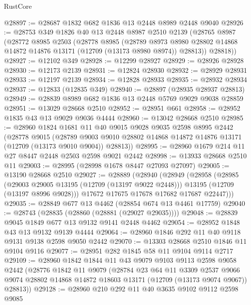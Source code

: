 \begin{lexlean}{RustCore}
\begin{coremodule}
@28897 := @28687 @1832 @682 @1836 @13 @2448 @8989 @2448 @9040
@28926 := @28753
    @349
    @1826
    @40
    @13
    @2448
    @8987
    @2510
    @2139
    (@28765
      @8987
      (@28772
        @8985
        @2503
        (@28778
          @8985
          (@28789
            @8973
            @8980
            @28802
            @14868
            @14872
            @14876
            @13171
            (@12709 (@13173 @8980 @8974))
            @28813))
        @28818))
@28927 := @12102 @349
@28928 := @12299 @28927
@28929 := @28926 @28928
@28930 := @12173 @2139
@28931 := @12824 @28930
@28932 := @28929 @28931
@28933 := @12197 @2139
@28934 := @12828 @28933
@28935 := @28932 @28934
@28937 := @12833 (@12835 @349)
@28940 := @28897 (@28935 @28937 @28813)
@28949 := @28839 @8989 @682 @1836 @13 @2448 @5769 @9029 @9038 @28859
@28951 := @13029 @28668 @2510
@28952 := @28951 @661
@28958 := @28952 @1835 @43 @13 @9029 @9036 @4444
@28960 := @13042 @28668 @2510
@28985 := @28960
    @1824
    @1681
    @11
    @40
    @9015
    @9028
    @9035
    @2598
    @8995
    @2442
    (@28778
      @9015
      (@28789 @9003 @9010 @28802 @14868 @14872 @14876 @13171 (@12709 (@13173 @9010 @9004)) @28813))
@28995 := @28960 @1679 @214 @11 @27 @8447 @2448 @2503 @2598 @9021 @2442
@28998 := @13933 @28668 @2510 @11
@29003 := @28995 (@28998 @1678 @8447 @27093 @27097)
@29005 := @13190 @28668 @2510
@29027 := @28889
    (@28940
      (@28949
        (@28958
          (@28985
            (@29003 @29005 @13195 (@12709 (@13197 @9022 @2448)))
            @13195
            (@12709 (@13197 @8996 @9028)))
          @17672
          @17675
          @17678
          @17682
          @17687
          @22447)))
@29035 := @28849 @677 @13 @4462 (@28854 @674 @13 @4461 @17759)
@29040 := @28743 (@28835 (@28860 (@28881 (@29027 @29035))))
@29048 := @28839 @9045 @1849 @677 @13 @9132 @9141 @2448 @4462
@29054 := @28952 @1848 @43 @13 @9132 @9139 @4444
@29064 := @28960 @1846 @292 @11 @40 @9118 @9131 @9138 @2598 @9050 @2442
@29070 := @13303 @28668 @2510 @1846 @11 @9104 @9116
@29077 := @28951 @282 @1845 @58 @11 @9104 @9114 @2717
@29109 := @28960
    @1842
    @1844
    @11
    @43
    @9079
    @9103
    @9113
    @2598
    @9058
    @2442
    (@28776
      @1842
      @11
      @9079
      (@28784
        @23
        @64
        @11
        @3309
        @2537
        @9066
        @9074
        @28802
        @14868
        @14872
        @18603
        @13171
        (@12709 (@13173 @9074 @9067))
        @28813))
@29128 := @28960
    @210
    @292
    @11
    @40
    @3635
    @9102
    @9112
    @2598
    @9085

\end{coremodule}
\end{lexlean}

